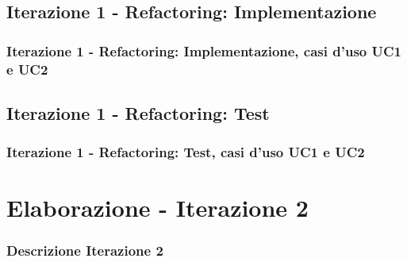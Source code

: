 \documentclass[t]{beamer} %
\begin{document}
\subsection{Iterazione 1 - Refactoring: Implementazione}
\begin{frame}
  \frametitle{Iterazione 1 - Refactoring: Implementazione, casi d'uso UC1 e UC2}
\end{frame}

\subsection{Iterazione 1 - Refactoring: Test}
\begin{frame}
  \frametitle{Iterazione 1 - Refactoring: Test, casi d'uso UC1 e UC2}
\end{frame}

\section{Elaborazione - Iterazione 2}
\begin{frame}
  \frametitle{Descrizione Iterazione 2}
\end{frame}
\end{document}
